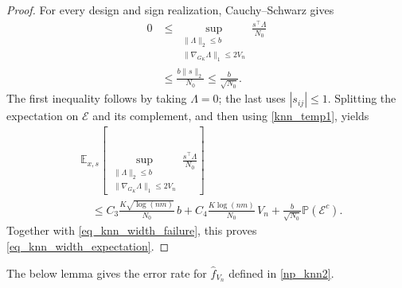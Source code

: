 \documentclass[twoside,11pt]{article}
\newenvironment{revision}{\color{revisionred}}{}
\begin{document}
\begin{proof}
\begin{revision}
For every design and sign realization, Cauchy--Schwarz gives
\[
\begin{aligned}
0&\leq
\sup_{\substack{\|\varLambda\|_2\leq b\\
                \|\nabla_{G_K}\varLambda\|_1\leq2V_n}}
       \frac{s^\top\varLambda}{N_0}\\
&\leq\frac{b\|s\|_2}{N_0}\leq\frac b{\sqrt{N_0}}.
\end{aligned}
\]
The first inequality follows by taking $\varLambda=0$; the last
uses $|s_{ij}|\leq1$. Splitting the expectation on $\mathcal E$
and its complement, and then using \eqref{knn_temp1}, yields
\begin{align*}
&\mathbb E_{x,s}\left[
\sup_{\substack{\|\varLambda\|_2\leq b\\
                \|\nabla_{G_K}\varLambda\|_1\leq2V_n}}
       \frac{s^\top\varLambda}{N_0}\right]\\
&\quad\leq C_3\frac{K\sqrt{\log(nm)}}{N_0}\,b
         +C_4\frac{K\log(nm)}{N_0}\,V_n
         +\frac b{\sqrt{N_0}}\mathbb P(\mathcal E^c).
\end{align*}
Together with \eqref{eq_knn_width_failure}, this proves
\eqref{eq_knn_width_expectation}.
\end{revision}

\end{proof}




The below lemma gives the error rate for $\hat{f}_{V_n}$ defined in \eqref{np_knn2}. 



    
\end{document}
